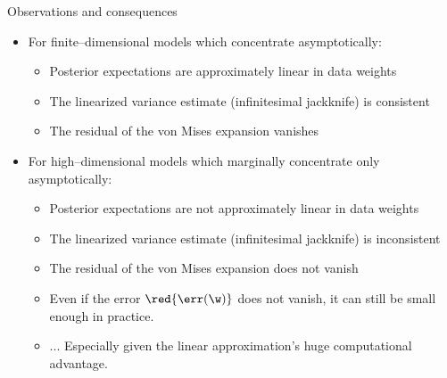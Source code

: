 
\begin{frame}{Observations and consequences}



\begin{itemize}
\item For finite--dimensional models which concentrate asymptotically:
\begin{itemize}
    \item Posterior expectations are approximately linear in data weights
    \item The linearized variance estimate (infinitesimal jackknife) is consistent
    \item The residual of the von Mises expansion vanishes
\end{itemize}
\item For high--dimensional models which marginally concentrate only asymptotically:
\begin{itemize}
    \item Posterior expectations are not approximately linear in data weights
    \item The linearized variance estimate (infinitesimal jackknife) is inconsistent
    \item The residual of the von Mises expansion does not vanish
    \item Even if the error $\red{\err(\w)}$ does not vanish,
            it can still be small enough in practice.
    \item[] ... Especially given the linear approximation's huge computational advantage.
\end{itemize}
\end{itemize}


\end{frame}
